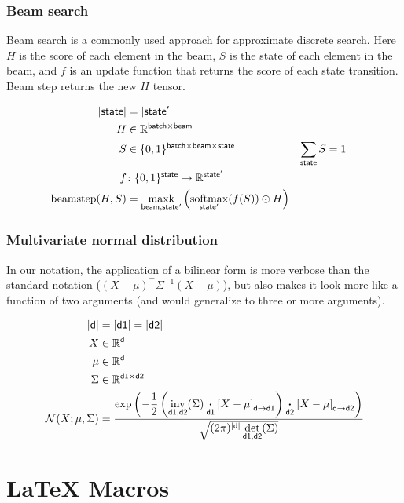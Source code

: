 \documentclass{article}
\newcommand{\reals}{\mathbb{R}}
\begin{document}
\subsubsection{Beam search}

Beam search is a commonly used approach for approximate discrete search. Here $H$ is the score of each element in the beam, $S$ is the state of each element in the beam, and $f$ is an update function that returns the score of each state transition. 
Beam step returns the new $H$ tensor. 

\begin{align*} 
|\name{state}| &= |\name{state'}| \\
H &\in \reals^{{\name{batch} \times \name{beam}}} \\
S &\in \{0, 1\}^{{\name{batch} \times \name{beam} \times \name{state}}} & \nsum{state} S &= 1\\
f &\colon \{0, 1\}^{{\name{state}}} \rightarrow \reals^{{\name{state'}}} \\ 
\text{beamstep}(H, S) &= \nfun{beam, state'}{maxk} \left( \nfun{state'}{softmax}(f(S)) \odot H \right)
\end{align*} 

\subsubsection{Multivariate normal distribution}

In our notation, the application of a bilinear form is more verbose than the standard notation ($(X-\mu)^\top \Sigma^{-1} (X-\mu)$), but also makes it look more like a function of two arguments (and would generalize to three or more arguments).

\begin{align*} 
|\name{d}| &= |\name{d1}| = |\name{d2}| \\
X &\in \reals^{\name{d}}  \\
\mu &\in \reals^{\name{d}}  \\
\Sigma & \in   \reals^{\name{d1} \times \name{d2}}  \\
{\cal N}(X; \mu, \Sigma) &= \frac{\displaystyle \exp\left(-\frac{1}{2}  \left(\nfun{d1, d2}{inv}(\Sigma) \ndot{d1} \nmov{d}{d1}{X - \mu} \right) \ndot{d2} \nmov{d}{d2}{X - \mu} \right)}{\sqrt{(2 \pi)^{|\name{d}|} \nfun{d1, d2}{det}(\Sigma)}}
\end{align*}

\section{\LaTeX{} Macros}
\end{document}
